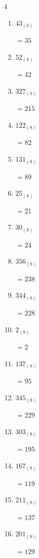 \begin{multicols}{4}
\begin{enumerate}
        $=163$

  \item $43_{(8)}$

        $=35$

  \item $52_{(8)}$

        $=42$

  \item $327_{(8)}$

        $=215$

  \item $122_{(8)}$

        $=82$

\columnbreak %

  \item $131_{(8)}$

        $=89$

  \item $25_{(8)}$

        $=21$

  \item $30_{(8)}$

        $=24$

  \item $356_{(8)}$

        $=238$

  \item $344_{(8)}$

        $=228$

  \item $2_{(8)}$

        $=2$

  \item $137_{(8)}$

        $=95$

  \item $345_{(8)}$

        $=229$

  \item $303_{(8)}$

        $=195$

  \item $167_{(8)}$

        $=119$

  \item $211_{(8)}$

        $=137$

  \item $201_{(8)}$

        $=129$


\end{enumerate}
\end{multicols}
